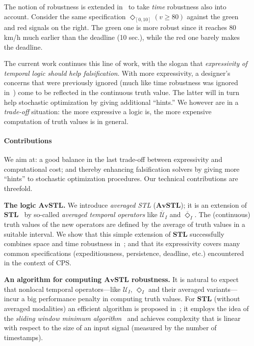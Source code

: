 \documentclass[envcountsect,orivec]{llncs} \usepackage{etex} \usepackage[]{graphicx}
\newcommand{\STL}{\textbf{STL}}
\newcommand{\UntilOp}[1]{\mathbin{\mathcal{U}_{#1}}}
\newcommand{\TUntil}[1]{\mathbin{\overline{\mathcal{U}}_{#1}}}
\newcommand{\DiaOp}[1]{\Diamond_{#1}}
\newcommand{\TDiaOp}[1]{\overline{\Diamond}_{#1}}
\newcommand{\AvSTL}{\textbf{AvSTL}}
\begin{document}
The notion of robustness is extended
in~\cite{DBLP:conf/formats/DonzeM10} to take  \emph{time} robustness also
into account. Consider the same specification $\DiaOp{[0, 10]}(v \geq
80)$ against the green and red signals on the right. The green one is
more robust since it reaches 80 km/h much earlier than the deadline (10
sec.), while the red one barely makes the deadline.

The current work continues this line of work, with the slogan that 
\emph{expressivity of temporal logic should help falsification}. 
With more expressivity, a designer's concerns that were
previously ignored (much like time robustness was ignored
in~\cite{DBLP:journals/tcs/FainekosP09}) come to be reflected in the
continuous truth value. The latter will in turn help stochastic
optimization by giving additional ``hints.'' We however are in a
\emph{trade-off} situation: the more expressive a logic is, the more expensive
computation of truth values is in general.



\paragraph{Contributions}  We aim at:  a good
balance 
in the last trade-off  between expressivity and computational cost; and thereby
enhancing  falsification solvers by giving 
more ``hints'' to stochastic optimization procedures. Our technical
contributions are threefold.

\textbf{The logic $\AvSTL$.} We introduce \emph{averaged STL} ($\AvSTL$); it is an
extension of $\STL$~\cite{DBLP:conf/formats/MalerN04} by
so-called \emph{averaged temporal operators} like $\TUntil{I}$ and
$\TDiaOp{I}$. The (continuous) truth values of the new operators are defined by  
the average of truth values in a suitable interval. 
We show that this simple extension 
of $\STL$ successfully combines
space and time robustness
in~\cite{DBLP:journals/tcs/FainekosP09,DBLP:conf/formats/DonzeM10}; and 
that its  expressivity covers many common specifications (expeditiousness,
persistence, deadline, etc.) 
encountered in the context of CPS. 

\textbf{An algorithm for computing $\AvSTL$ robustness.} It is natural
to expect that nonlocal temporal operators---like $\UntilOp{I}$, $\DiaOp{I}$ and their 
averaged variants---incur a big performance penalty in  computing
truth values.
For $\STL$ (without averaged modalities) an efficient algorithm is
proposed in~\cite{DBLP:conf/cav/DonzeFM13}; it employs the idea of
the \emph{sliding window minimum algorithm}~\cite{DBLP:journals/njc/Lemire06} 
and achieves complexity
that is linear with respect to the size of an input signal (measured by
the number of timestamps). 
\end{document}

